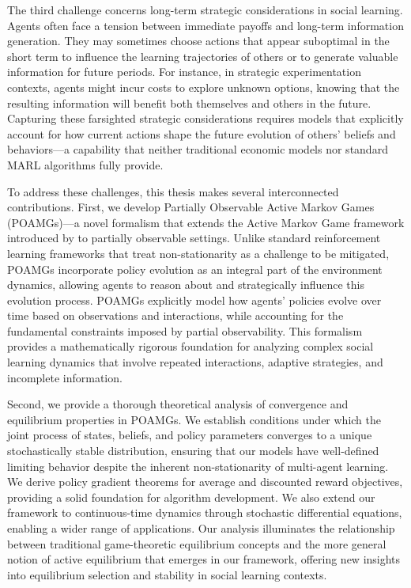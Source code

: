 \documentclass[a4paper,12pt]{report}
\begin{document}
The third challenge concerns long-term strategic considerations in social learning. Agents often face a tension between immediate payoffs and long-term information generation. They may sometimes choose actions that appear suboptimal in the short term to influence the learning trajectories of others or to generate valuable information for future periods. For instance, in strategic experimentation contexts, agents might incur costs to explore unknown options, knowing that the resulting information will benefit both themselves and others in the future. Capturing these farsighted strategic considerations requires models that explicitly account for how current actions shape the future evolution of others' beliefs and behaviors—a capability that neither traditional economic models nor standard MARL algorithms fully provide.

To address these challenges, this thesis makes several interconnected contributions. First, we develop Partially Observable Active Markov Games (POAMGs)—a novel formalism that extends the Active Markov Game framework introduced by \citet{kim2022influencing} to partially observable settings. Unlike standard reinforcement learning frameworks that treat non-stationarity as a challenge to be mitigated, POAMGs incorporate policy evolution as an integral part of the environment dynamics, allowing agents to reason about and strategically influence this evolution process. POAMGs explicitly model how agents' policies evolve over time based on observations and interactions, while accounting for the fundamental constraints imposed by partial observability. This formalism provides a mathematically rigorous foundation for analyzing complex social learning dynamics that involve repeated interactions, adaptive strategies, and incomplete information.

Second, we provide a thorough theoretical analysis of convergence and equilibrium properties in POAMGs. We establish conditions under which the joint process of states, beliefs, and policy parameters converges to a unique stochastically stable distribution, ensuring that our models have well-defined limiting behavior despite the inherent non-stationarity of multi-agent learning. We derive policy gradient theorems for average and discounted reward objectives, providing a solid foundation for algorithm development. We also extend our framework to continuous-time dynamics through stochastic differential equations, enabling a wider range of applications. Our analysis illuminates the relationship between traditional game-theoretic equilibrium concepts and the more general notion of active equilibrium that emerges in our framework, offering new insights into equilibrium selection and stability in social learning contexts.
\end{document}

